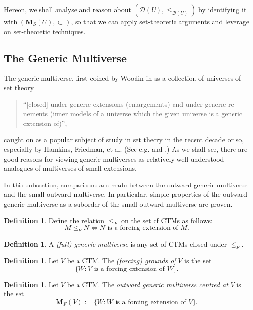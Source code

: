 \documentclass[12pt, twoside]{memoir}
\numberwithin{equation}{section}
\theoremstyle{definition}
\newtheorem{defi}[thm]{Definition}
\theoremstyle{remark}
\theoremstyle{definition}
\theoremstyle{definition}
\theoremstyle{definition}
\theoremstyle{remark}
\begin{document}
Hereon, we shall analyse and reason about $(\mathcal{D}(U), \leq_{\mathcal{D}(U)})$ by identifying it with $(\mathbf{M}_S(U), \subset)$, so that we can apply set-theoretic arguments and leverage on set-theoretic techniques.

\subsection{The Generic Multiverse}\label{genmul}

The generic multiverse, first coined by Woodin in \cite{woodingen} as a collection of universes of set theory 
\begin{quote}
    ``[closed] under generic extensions (enlargements) and under generic re nements (inner models of a universe which the given universe is a generic extension of)'',
\end{quote}
caught on as a popular subject of study in set theory in the recent decade or so, especially by Hamkins, Friedman, et al. (See e.g. \cite{hamkinsmoving} and \cite{sygeneric}.) As we shall see, there are good reasons for viewing generic multiverses as relatively well-understood analogues of multiverses of small extensions.

In this subsection, comparisons are made between the outward generic multiverse and the small outward multiverse. In particular, simple properties of the outward generic multiverse as a suborder of the small outward multiverse are proven.

\begin{defi}
Define the relation $\leq_F$ on the set of CTMs as follows:
\begin{equation*}
    M \leq_F N \iff N \text{ is a forcing extension of } M \text{.}
\end{equation*}
\end{defi}

\begin{defi}
A \emph{(full) generic multiverse} is any set of CTMs closed under $\leq_F$.
\end{defi}

\begin{defi}
Let $V$ be a CTM. The \emph{(forcing) grounds of} $V$ is the set
\begin{equation*}
    \{W : V \text{ is a forcing extension of } W\} \text{.}
\end{equation*}
\end{defi}

\begin{defi}\label{def9116}
Let $V$ be a CTM. The \emph{outward generic multiverse centred at} $V$ is the set
\begin{equation*}
    \mathbf{M}_F(V) := \{W : W \text{ is a forcing extension of } V\} \text{.}
\end{equation*}
\end{defi} 
\end{document}
